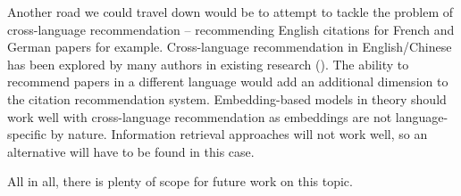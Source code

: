 Another road we could travel down would be to attempt to tackle the problem of cross-language recommendation -- recommending English citations for French and German papers for example. Cross-language recommendation in English/Chinese has been explored by many authors in existing research (\cite{TangWZ14,JiangLL18, JiangYGLL18}). The ability to recommend papers in a different language would add an additional dimension to the citation recommendation system. Embedding-based models in theory should work well with cross-language recommendation as embeddings are not language-specific by nature. Information retrieval approaches will not work well, so an alternative will have to be found in this case. 

All in all, there is plenty of scope for future work on this topic.